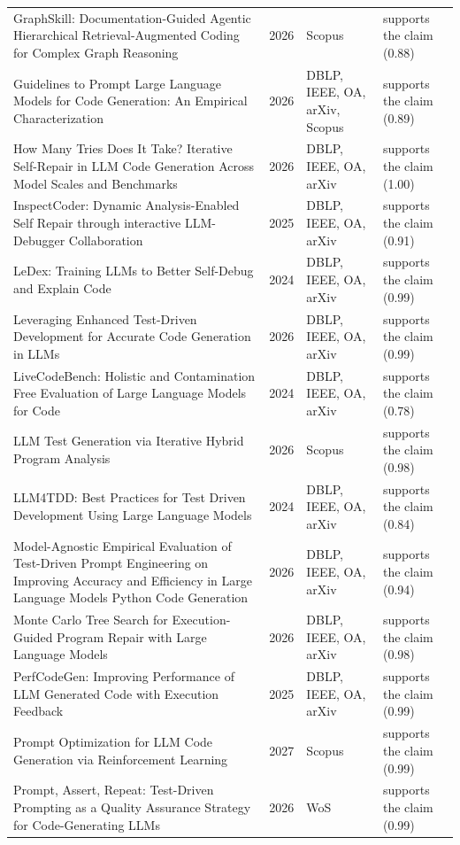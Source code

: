 \begin{longtable}{@{}%
  >{\raggedright\arraybackslash}p{}c%
  >{\raggedright\arraybackslash}p{}%
  >{\raggedright\arraybackslash}p{}@{}}
GraphSkill: Documentation-Guided Agentic Hierarchical Retrieval-Augmented Coding for Complex Graph Reasoning & 2026 & Scopus & supports the claim (0.88) \\
Guidelines to Prompt Large Language Models for Code Generation: An Empirical Characterization & 2026 & DBLP, IEEE, OA, arXiv, Scopus & supports the claim (0.89) \\
How Many Tries Does It Take? Iterative Self-Repair in LLM Code Generation Across Model Scales and Benchmarks & 2026 & DBLP, IEEE, OA, arXiv & supports the claim (1.00) \\
InspectCoder: Dynamic Analysis-Enabled Self Repair through interactive LLM-Debugger Collaboration & 2025 & DBLP, IEEE, OA, arXiv & supports the claim (0.91) \\
LeDex: Training LLMs to Better Self-Debug and Explain Code & 2024 & DBLP, IEEE, OA, arXiv & supports the claim (0.99) \\
Leveraging Enhanced Test-Driven Development for Accurate Code Generation in LLMs & 2026 & DBLP, IEEE, OA, arXiv & supports the claim (0.99) \\
LiveCodeBench: Holistic and Contamination Free Evaluation of Large Language Models for Code & 2024 & DBLP, IEEE, OA, arXiv & supports the claim (0.78) \\
LLM Test Generation via Iterative Hybrid Program Analysis & 2026 & Scopus & supports the claim (0.98) \\
LLM4TDD: Best Practices for Test Driven Development Using Large Language Models & 2024 & DBLP, IEEE, OA, arXiv & supports the claim (0.84) \\
Model-Agnostic Empirical Evaluation of Test-Driven Prompt Engineering on Improving Accuracy and Efficiency in Large Language Models Python Code Generation & 2026 & DBLP, IEEE, OA, arXiv & supports the claim (0.94) \\
Monte Carlo Tree Search for Execution-Guided Program Repair with Large Language Models & 2026 & DBLP, IEEE, OA, arXiv & supports the claim (0.98) \\
PerfCodeGen: Improving Performance of LLM Generated Code with Execution Feedback & 2025 & DBLP, IEEE, OA, arXiv & supports the claim (0.99) \\
Prompt Optimization for LLM Code Generation via Reinforcement Learning & 2027 & Scopus & supports the claim (0.99) \\
Prompt, Assert, Repeat: Test-Driven Prompting as a Quality Assurance Strategy for Code-Generating LLMs & 2026 & WoS & supports the claim (0.99) \\

\end{longtable}
